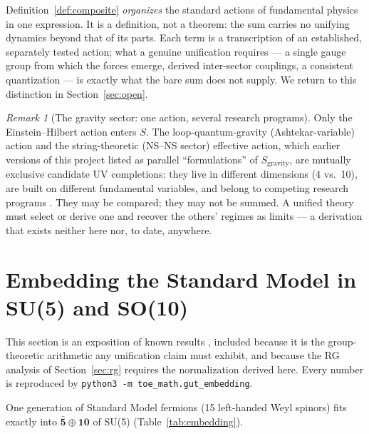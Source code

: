\documentclass[11pt]{article}
\theoremstyle{remark}
\newtheorem{remark}{Remark}
\begin{document}
Definition~\ref{def:composite} \emph{organizes} the standard actions of
fundamental physics in one expression. It is a definition, not a
theorem: the sum carries no unifying dynamics beyond that of its parts.
Each term is a transcription of an established, separately tested
action; what a genuine unification requires --- a single gauge group
from which the forces emerge, derived inter-sector couplings, a
consistent quantization --- is exactly what the bare sum does not
supply. We return to this distinction in Section~\ref{sec:open}.

\begin{remark}[The gravity sector: one action, several research
programs]
\label{rem:gravity}
Only the Einstein--Hilbert action enters $S$. The loop-quantum-gravity
(Ashtekar-variable) action and the string-theoretic (NS--NS sector)
effective action, which earlier versions of this project listed as
parallel ``formulations'' of $S_{\mathrm{gravity}}$, are mutually
exclusive candidate UV completions: they live in different dimensions
(4 vs.\ 10), are built on different fundamental variables, and belong
to competing research programs \cite{rovelli,polchinski}. They may be
compared; they may not be summed. A unified theory must select or
derive one and recover the others' regimes as limits --- a derivation
that exists neither here nor, to date, anywhere.
\end{remark}

\section{Embedding the Standard Model in SU(5) and SO(10)}
\label{sec:embedding}

This section is an exposition of known results
\cite{georgi-glashow,fritzsch-minkowski}, included because it is the
group-theoretic arithmetic any unification claim must exhibit, and
because the RG analysis of Section~\ref{sec:rg} requires the
normalization derived here. Every number is reproduced by
\texttt{python3 -m toe\_math.gut\_embedding}.

One generation of Standard Model fermions (15 left-handed Weyl spinors)
fits exactly into $\bar{\mathbf{5}}\oplus\mathbf{10}$ of SU(5)
(Table~\ref{tab:embedding}).
\end{document}
